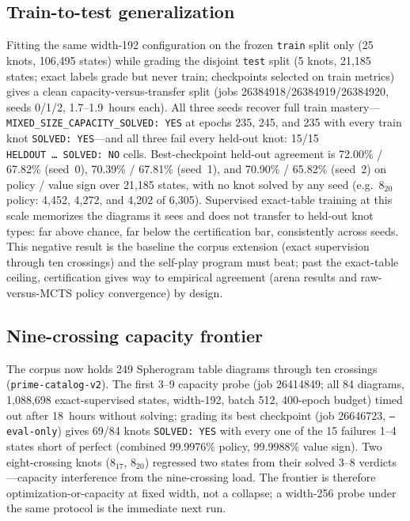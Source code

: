 \subsection{Train-to-test generalization}
\label{sec:generalization}

Fitting the same width-192 configuration on the frozen \texttt{train} split
only (25 knots, 106,495 states) while grading the disjoint \texttt{test} split
(5 knots, 21,185 states; exact labels grade but never train; checkpoints
selected on train metrics) gives a clean capacity-versus-transfer split
(jobs 26384918/26384919/26384920, seeds 0/1/2, 1.7--1.9~hours each). All three
seeds recover full train mastery---\texttt{MIXED\_SIZE\_CAPACITY\_SOLVED: YES}
at epochs 235, 245, and 235 with every train knot \texttt{SOLVED: YES}---and
all three fail every held-out knot: 15/15 \texttt{HELDOUT~\ldots~SOLVED: NO}
cells. Best-checkpoint held-out agreement is 72.00\% / 67.82\% (seed~0),
70.39\% / 67.81\% (seed~1), and 70.90\% / 65.82\% (seed~2) on policy /
value sign over 21,185 states, with no knot solved by any seed
(e.g.\ $8_{20}$ policy: 4,452, 4,272, and 4,202 of 6,305). Supervised
exact-table training at this scale memorizes the diagrams it sees and does
not transfer to held-out knot types: far above chance, far below the
certification bar, consistently across seeds. This negative result is the
baseline the corpus extension (exact supervision through ten crossings) and
the self-play program must beat; past the exact-table ceiling, certification
gives way to empirical agreement (arena results and raw-versus-MCTS policy
convergence) by design.

\subsection{Nine-crossing capacity frontier}
\label{sec:nine}

The corpus now holds 249 Spherogram table diagrams through ten crossings
(\texttt{prime-catalog-v2}). The first 3--9 capacity probe (job 26414849;
all 84 diagrams, 1,088,698 exact-supervised states, width-192, batch 512,
400-epoch budget) timed out after 18~hours without solving; grading its best
checkpoint (job 26646723, \texttt{--eval-only}) gives 69/84 knots
\texttt{SOLVED: YES} with every one of the 15 failures 1--4 states short of
perfect (combined 99.9976\% policy, 99.9988\% value sign). Two eight-crossing
knots ($8_{17}$, $8_{20}$) regressed two states from their solved 3--8
verdicts---capacity interference from the nine-crossing load. The frontier is
therefore optimization-or-capacity at fixed width, not a collapse; a width-256
probe under the same protocol is the immediate next run.

